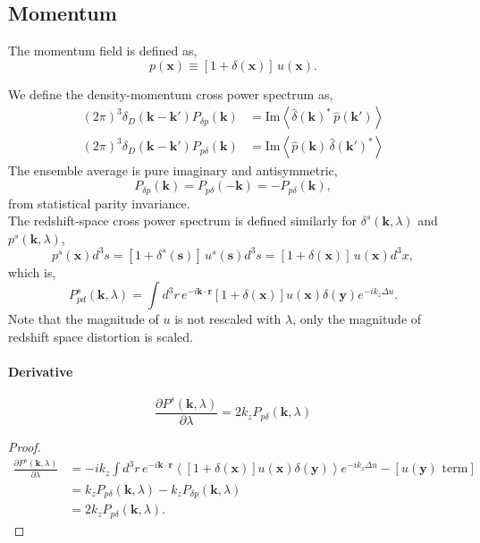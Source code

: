 \documentclass[a4paper,11pt, fleqn]{article}
\begin{document}
\subsection{Momentum}

The momentum field is defined as,
%
\begin{equation}
  p(\bm{x}) \equiv [1 + \delta(\bm{x})] \, u(\bm{x}).
\end{equation}

We define the density-momentum cross power spectrum as,
\begin{align}
  (2\pi)^3 \delta_D(\bm{k} - \bm{k}') P_{\delta p}(\bm{k})
  &= \mathrm{Im} \left\langle
  \hat{\delta}(\bm{k})^* \, \hat{p}(\bm{k}')
  \right\rangle\\
%
  (2\pi)^3 \delta_D(\bm{k} - \bm{k}') P_{p \delta}(\bm{k})
  &= \mathrm{Im} \left\langle
  \hat{p}(\bm{k}) \, \hat{\delta}(\bm{k}')^*
  \right\rangle
\end{align}
The ensemble average is pure imaginary and antisymmetric,
%
\begin{equation}
  P_{\delta p}(\bm{k}) = P_{p \delta}(-\bm{k})
  = -P_{p \delta}(\bm{k}),
\end{equation}
from statistical parity invariance.\\

The redshift-space cross power spectrum is defined similarly for $\delta^s(\bm{k}, \lambda)$ and $p^s(\bm{k}, \lambda)$,
%
\begin{equation}
  p^s(\bm{x}) d^3 s = [1 + \delta^s(\bm{s})] \,u^s(\bm{s}) d^3 s
    = [1 + \delta(\bm{x}) ] \, u(\bm{x}) d^3 x,
\end{equation}
%
which is,
%
\begin{equation}
  P^s_{pd}(\bm{k}, \lambda) = \int\! d^3 r \, e^{-i \bm{k}\cdot\bm{r}}
  [ 1 + \delta(\bm{x}) ] u(\bm{x}) \delta(\bm{y})
  e^{-i k_z \Delta u}.
\end{equation}
%
Note that the magnitude of $u$ is not rescaled with $\lambda$, only the
magnitude of redshift space distortion is scaled.

\paragraph{Derivative}

\begin{equation}
  \frac{\partial P^s(\bm{k}, \lambda)}{\partial \lambda}
  = 2 k_z P_{p \delta}(\bm{k}, \lambda)
\end{equation}

\begin{proof}
\begin{equation}\begin{split}
  \frac{\partial P^s(\bm{k}, \lambda)}{\partial \lambda}
  &= -ik_z \int \! d^3r \, e^{-i\bm{k}\cdot\bm{r}} \left\langle
  [1 + \delta(\bm{x})] u(\bm{x}) \delta(\bm{y}) \right\rangle e^{-ik_z \Delta u}
  - [u(\bm{y}) \mbox{ term}]\\
  &= k_z P_{p\delta}(\bm{k}, \lambda) - k_z P_{\delta p}(\bm{k}, \lambda)\\
  &= 2k_z P_{p\delta}(\bm{k}, \lambda).
\end{split}\end{equation}
\end{proof}
\end{document}
